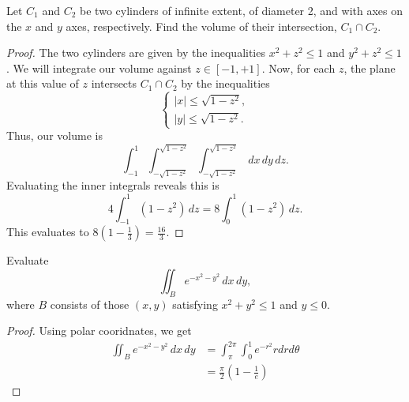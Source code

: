 \documentclass[openany]{book}
\begin{document}
\begin{prob}[8]
    Let \( C_1 \) and \( C_2 \) be two cylinders of infinite extent, of diameter 2, and with axes on the \( x \) and \( y \) axes, respectively. Find the volume of their intersection, \( C_1 \cap C_2 \).
\end{prob}
\begin{proof}
    The two cylinders are given by the inequalities $x^2+z^2\le1$ and $y^2+z^2\le1$. We will integrate our volume against $z\in[-1,+1]$. Now, for each $z$, the plane at this value of $z$ intersects $C_1\cap C_2$ by the inequalities
    \[\begin{cases}
        \left|x\right|\le\sqrt{1-z^2}, \\
        \left|y\right|\le\sqrt{1-z^2}.
    \end{cases}\]
    Thus, our volume is
    \[\int_{-1}^1\int_{-\sqrt{1-z^2}}^{\sqrt{1-z^2}}\int_{-\sqrt{1-z^2}}^{\sqrt{1-z^2}}\,dx\,dy\,dz.\]
    Evaluating the inner integrals reveals this is
    \[4\int_{-1}^1\left(1-z^2\right)\,dz=8\int_0^1\left(1-z^2\right)\,dz.\]
    This evaluates to $8\left(1-\frac13\right)=\frac{16}3$.
\end{proof}

\begin{prob}[22]
    Evaluate
    \[
    \iint_{B} e^{-x^2-y^2} \, dx \, dy,
    \]
    where \( B \) consists of those \( (x, y) \) satisfying \( x^2 + y^2 \leq 1 \) and \( y \leq 0 \).
\end{prob}
\begin{proof}
    Using polar cooridnates, we get 
    \begin{align*}
        \iint_{B} e^{-x^2-y^2} \, dx \, dy&=\int_{\pi}^{2\pi}\int_0^1e^{-r^2}rdrd\theta\\
        &=\frac{\pi}{2}\left(1-\frac{1}{e}\right)
    \end{align*}
\end{proof}
\end{document}
